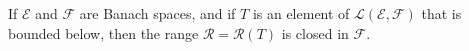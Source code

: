 If $\mathcal{E}$ and $\mathcal{F}$ are Banach spaces, and if $T$ is an element of $\mathcal{L}(\mathcal{E}, \mathcal{F})$ that is bounded below, then the range $\mathcal{R} = \mathcal{R}(T)$ is closed in $\mathcal{F}$.
